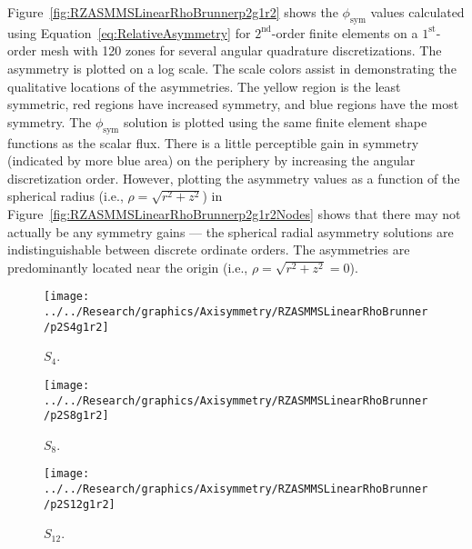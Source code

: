\documentclass[12pt]{article}
\begin{document}
\FloatBarrier

Figure~\ref{fig:RZASMMSLinearRhoBrunnerp2g1r2} shows the $\phi_\text{sym}$ values calculated using Equation~\ref{eq:RelativeAsymmetry} for $2^\text{nd}$-order finite elements on a $1^\text{st}$-order mesh with 120 zones for several angular quadrature discretizations. The asymmetry is plotted on a log scale. The scale colors assist in demonstrating the qualitative locations of the asymmetries. The yellow region is the least symmetric, red regions have increased symmetry, and blue regions have the most symmetry. The $\phi_\text{sym}$ solution is plotted using the same finite element shape functions as the scalar flux. There is a little perceptible gain in symmetry (indicated by more blue area) on the periphery by increasing the angular discretization order. However, plotting the asymmetry values as a function of the spherical radius (i.e., $\rho=\sqrt{r^2+z^2}$) in Figure~\ref{fig:RZASMMSLinearRhoBrunnerp2g1r2Nodes} shows that there may not actually be any symmetry gains --- the spherical radial asymmetry solutions are indistinguishable between discrete ordinate orders. The asymmetries are predominantly located near the origin (i.e., $\rho=\sqrt{r^2+z^2}=0$).

\begin{sidewaysfigure}[!htb]
\centering
\begin{subfigure}{0.33\textwidth}
\texttt{[image: ../../Research/graphics/Axisymmetry/RZASMMSLinearRhoBrunner/p2S4g1r2]}
\caption{$S_4$.}
\end{subfigure}%
\begin{subfigure}{0.33\textwidth}
\texttt{[image: ../../Research/graphics/Axisymmetry/RZASMMSLinearRhoBrunner/p2S8g1r2]}
\caption{$S_8$.}
\end{subfigure}%
\begin{subfigure}{0.33\textwidth}
\texttt{[image: ../../Research/graphics/Axisymmetry/RZASMMSLinearRhoBrunner/p2S12g1r2]}
\caption{$S_{12}$.}
\end{subfigure}
\caption{Relative asymmetry for $2^\text{st}$-order finite elements on a $1^\text{st}$-order mesh for given order of level-symmetric angular quadrature.}
\label{fig:RZASMMSLinearRhoBrunnerp2g1r2}
\end{sidewaysfigure}
\end{document}
